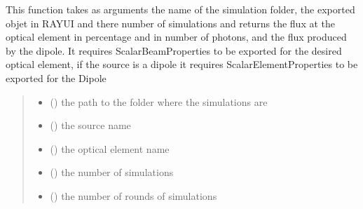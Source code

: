 \documentclass[letterpaper,10pt,english]{sphinxmanual}
\begin{document}
\begin{fulllineitems}

\begin{fulllineitems}
\label{\detokenize{code_documentation:raypyng.postprocessing.PostProcessAnalyzed.retrieve_flux_beamline}}
\pysigstartsignatures
{}
\pysigstopsignatures
\sphinxAtStartPar
This function takes as arguments the name of the
simulation folder, the exported objet in RAY\sphinxhyphen{}UI and there
number of simulations and returns the flux at the optical element in
percentage and in number of photons, and the flux produced
by the dipole.
It requires ScalarBeamProperties to be exported for the desired optical element,
if the source is a dipole it requires ScalarElementProperties to be exported for the Dipole
\begin{quote}\begin{description}
\begin{itemize}
\item {} 
\sphinxAtStartPar
{} () \textendash{} the path to the folder where the simulations are

\item {} 
\sphinxAtStartPar
{} () \textendash{} the source name

\item {} 
\sphinxAtStartPar
{} () \textendash{} the optical element name

\item {} 
\sphinxAtStartPar
{} () \textendash{} the number of simulations

\item {} 
\sphinxAtStartPar
{} () \textendash{} the number of rounds of simulations


\end{itemize}
\end{description}
\end{quote}
\end{fulllineitems}
\end{fulllineitems}
\end{document}
